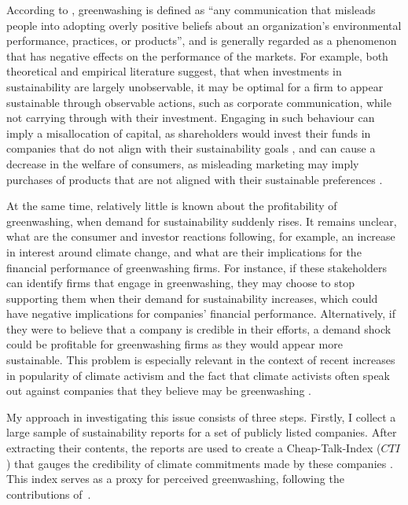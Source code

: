 \documentclass[12pt]{article}
\begin{document}
According to \textcite{lyonMeansEndGreenwash2015}, greenwashing is defined as ``any communication that misleads people into adopting overly positive beliefs about an organization's  environmental performance, practices, or products'', and is generally regarded as a phenomenon that has negative effects on the performance of the markets. For example, both theoretical \parencite{wuBadGreenwashingGood2020, cartellierCanInvestorsCurb2023} and empirical \parencite{barrageAdvertisingEnvironmentalStewardship2020, marquisScrutinyNormsSelective2016, kimGreenwashVsBrownwash2015} literature suggest, that when investments in sustainability are largely unobservable, it may be optimal for a firm to appear sustainable through observable actions, such as corporate communication, while not carrying through with their investment. Engaging in such behaviour can imply a misallocation of capital, as shareholders would invest their funds in companies that do not align with their sustainability goals \parencite{kimGreenwashVsBrownwash2015}, and can cause a decrease in the welfare of consumers, as misleading marketing may imply purchases of products that are not aligned with their sustainable preferences \parencite{barrageAdvertisingEnvironmentalStewardship2020}.

At the same time, relatively little is known about the profitability of greenwashing, when demand for sustainability suddenly rises. It remains unclear, what are the consumer and investor reactions following, for example, an increase in interest around climate change, and what are their implications for the financial performance of greenwashing firms. For instance, if these stakeholders can identify firms that engage in greenwashing, they may choose to stop supporting them when their demand for sustainability increases, which could have negative implications for companies' financial performance. Alternatively, if they were to believe that a company is credible in their efforts, a demand shock could be profitable for greenwashing firms as they would appear more sustainable. This problem is especially relevant in the context of recent increases in popularity of climate activism and the fact that climate activists often speak out against companies that they believe may be greenwashing \parencite{pew2021genz, horton2022greenwashing}.


My approach in investigating this issue consists of three steps. Firstly, I collect a large sample of sustainability reports for a set of publicly listed companies. After extracting their contents, the reports are used to create a Cheap-Talk-Index ($CTI$) that gauges the credibility of climate commitments made by these companies \parencite{binglerHowCheapTalk2024}. This index serves as a proxy for perceived greenwashing, following the contributions of~\textcite{coenAreCorporateClimate2022}.
\end{document}
